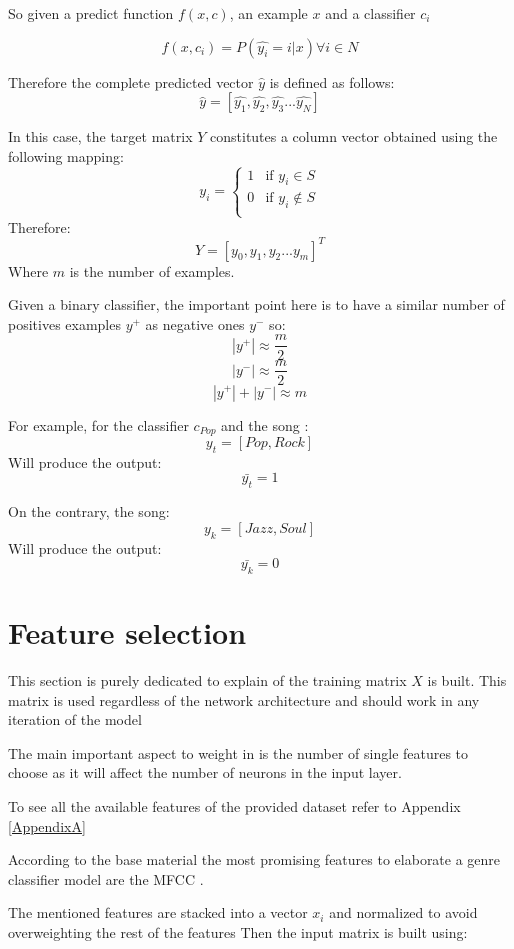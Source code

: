 So given a predict function  $f(x, c)$, an example $x$ and a classifier $c_i$ 

$$ f(x, c_i) =  P(\hat{y_i} = i | x) \forall i \in N $$

Therefore the complete predicted vector $\hat{y}$ is defined as follows:
$$ \hat{y} = [ \hat{y_1}, \hat{y_2}, \hat{y_3} ... \hat{y_N} ] $$

In this case, the target matrix \(Y\) constitutes a column vector obtained using the following mapping:
$$ {y_i} =
\begin{cases}
    1 & \text{if } y_i \in S\\
    0 & \text{if } y_i \notin S\\
\end{cases}
$$
Therefore:
$$ Y = [y_0, y_1, y_2 ... y_m]^T $$
Where $m$ is the number of examples.

Given a binary classifier, the important point here is to have a similar number of positives examples $y^+$ as negative ones $y^-$ so:
$$ |y^+|  \approx \frac{m}{2} $$
$$ |y^-|  \approx \frac{m}{2} $$
$$ |y^+| + |y^-| \approx m $$

For example, for the classifier $c_{Pop}$ and the song :
$$ y_t  = [ Pop, Rock ] $$
Will produce the output:
$$ \bar{y_t}  = 1 $$

On the contrary, the song:
$$ y_k  = [ Jazz, Soul ] $$
Will produce the output:
$$ \bar{y_k}  = 0 $$

\newpage

\section{Feature selection}
\label{feature selection}

This section is purely dedicated to explain of the training matrix $X$ is built.
This matrix is used regardless of the network architecture and should work in any iteration of the model

The main important aspect to weight in is the number of single features to choose as it will affect the number of neurons in the input layer.

To see all the available features of the provided dataset refer to Appendix \ref{AppendixA}

According to the base material the most promising features to elaborate a genre classifier model are the MFCC \cite{Jensen2006} \cite{Li2011}.

The mentioned features are stacked into a vector $x_i$ and normalized to avoid overweighting the rest of the features 
Then the input matrix is built using:

